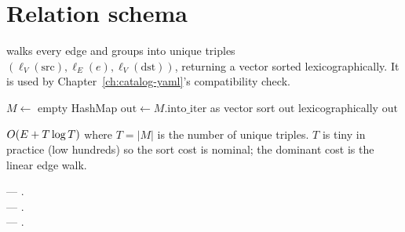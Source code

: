 \section{Relation schema}

 walks every edge and groups into
unique triples $(\ell_V(\text{src}), \ell_E(e), \ell_V(\text{dst}))$,
returning a vector sorted lexicographically. It is used by
Chapter~\ref{ch:catalog-yaml}'s compatibility check.

\begin{algorithm}
\caption{\textsc{Get-Relation-Schema}}\label{alg:rel-schema}
$M \gets$ empty HashMap\;
$\mathrm{out} \gets M.\text{into\_iter}$ as vector\;
sort $\mathrm{out}$ lexicographically\;
\Return $\mathrm{out}$\;
\end{algorithm}

\begin{complexity}
$O(E + T \log T)$ where $T = |M|$ is the number of unique
triples. $T$ is tiny in practice (low hundreds) so the sort cost is
nominal; the dominant cost is the linear edge walk.
\end{complexity}

\begin{inthecode}
 ---
.\\
 ---
.\\
 ---
.
\end{inthecode}
